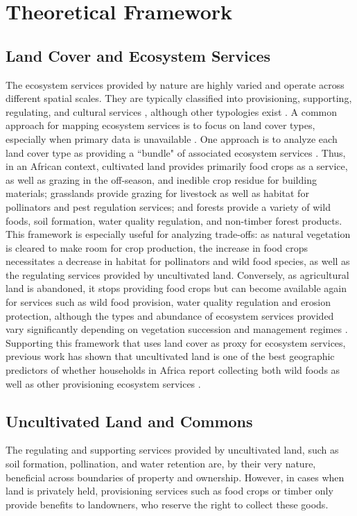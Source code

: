 \documentclass{article}
\begin{document}
\section{Theoretical Framework}

\subsection{Land Cover and Ecosystem Services}
The ecosystem services provided by nature are highly varied and operate across different spatial scales.  They are typically classified into provisioning, supporting, regulating, and cultural services \cite{Martinez-Harms2012}, although other typologies exist \cite{Fisher2008}.  A common approach for mapping ecosystem services is to focus on land cover types, especially when primary data is unavailable \cite{Martinez-Harms2012}.  One approach is to analyze each land cover type as providing a ``bundle" of associated ecosystem services \cite{Raudsepp-Hearne2010}.  Thus, in an African context, cultivated land provides primarily food crops as a service, as well as grazing in the off-season, and inedible crop residue for building materials; grasslands provide grazing for livestock as well as habitat for pollinators and pest regulation services; and forests provide a variety of wild foods, soil formation, water quality regulation, and non-timber forest products.  This framework is especially useful for analyzing trade-offs: as natural vegetation is cleared to make room for crop production, the increase in food crops necessitates a decrease in habitat for pollinators and wild food species, as well as the regulating services provided by uncultivated land.  Conversely, as agricultural land is abandoned, it stops providing food crops but can become available again for services such as wild food provision, water quality regulation and erosion protection, although the types and abundance of ecosystem services provided vary significantly depending on vegetation succession and management regimes \cite{wessels2019mapping}.  Supporting this framework that uses land cover as proxy for ecosystem services, previous work has shown that uncultivated land is one of the best geographic predictors of whether households in Africa report collecting both wild foods as well as other provisioning ecosystem services \cite{Cooper2018a}.

\subsection{Uncultivated Land and Commons}
The regulating and supporting services provided by uncultivated land, such as soil formation, pollination, and water retention are, by their very nature, beneficial across boundaries of property and ownership.  However, in cases when land is privately held, provisioning services such as food crops or timber only provide benefits to landowners, who reserve the right to collect these goods.  
\end{document}
